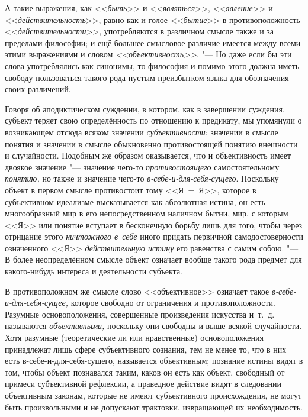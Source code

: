 А такие выражения, как <<{\em быть}>> и <<{\em являться}>>,
<<{\em явление}>> и <<{\em действительность}>>, равно как и голое
<<{\em бытие}>> в противоположность <<{\em действительности}>>,
употребляются в различном смысле также и за пределами
философии; и ещё большее смысловое различие имеется между всеми этими
выражениями и словом {\em <<объективность>>}. "---
Но даже если бы эти слова употреблялись как синонимы, то
философия и помимо этого должна иметь свободу пользоваться такого рода
пустым преизбытком языка для обозначения своих различений.

Говоря об аподиктическом суждении, в котором, как в завершении
суждения, субъект теряет свою определённость по отношению к предикату, мы
упомянули о возникающем отсюда всяком значении {\em субъективности}:
значении в смысле понятия и значении в смысле обыкновенно
противостоящей понятию внешности и
случайности.
Подобным же образом оказывается, что и объективность имеет
двоякое значение "--- значение чего-то {\em противостоящего}
самостоятельному {\em понятию,} но также и значение чего-то
{\em в-себе-и-для-себя-сущего}.
Поскольку объект в первом смысле противостоит тому <<Я~=~Я>>,
которое в субъективном идеализме высказывается как абсолютная истина, он
есть многообразный мир в его непосредственном наличном
бытии, мир, с которым <<Я>> или понятие вступает в бесконечную борьбу лишь
для того, чтобы через отрицание этого {\em ничтожного в~себе}
иного придать первичной самодостоверности означенного <<Я>>
{\em действительную истину} его равенства с самим
собою.
"--- В более неопределённом смысле объект означает вообще такого
рода предмет для какого-нибудь интереса и деятельности субъекта.

В противоположном же смысле слово <<объективное>> означает такое
{\em в-себе-и-для-себя-сущее,}
которое свободно от ограничения и противоположности. Разумные
основоположения, совершенные произведения искусства и~т.~д. называются
{\em объективными,}
поскольку они свободны и выше всякой случайности. Хотя
разумные (теоретические ли или нравственные) основоположения принадлежат
лишь сфере субъективного сознания, тем не менее то, что в них есть
в-себе-и-для-себя-сущего, называется объективным; познание истины видят в
том, чтобы объект познавался таким, каков он есть как объект, свободный от
примеси субъективной рефлексии, а праведное действие видят в следовании
объективным законам, которые не имеют субъективного происхождения, не могут
быть произвольными и не допускают трактовки, извращающей их необходимость.

